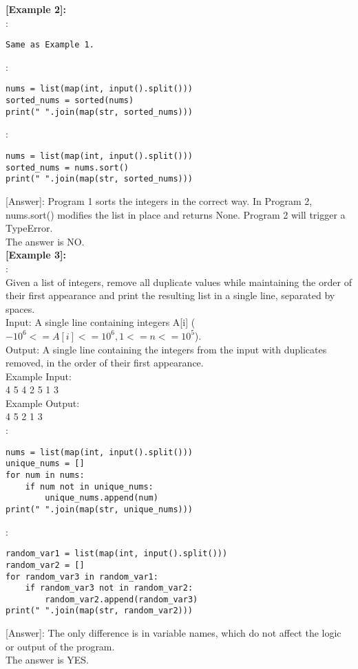 \noindent\textbf{[Example 2]:}\\
:\\
\begin{lstlisting}
Same as Example 1.
\end{lstlisting}
\text{    [Program 1]}:\\
\begin{lstlisting}
nums = list(map(int, input().split()))
sorted_nums = sorted(nums)
print(" ".join(map(str, sorted_nums)))
\end{lstlisting}
\text{    [Program 2]}:\\
\begin{lstlisting}
nums = list(map(int, input().split()))
sorted_nums = nums.sort()
print(" ".join(map(str, sorted_nums)))
\end{lstlisting}
[Answer]: Program 1 sorts the integers in the correct way. In Program 2, nums.sort() modifies the list in place and returns None. Program 2 will trigger a TypeError.\\
The answer is NO.\\

\noindent\textbf{[Example 3]:}\\
:\\
Given a list of integers, remove all duplicate values while maintaining the order of their first appearance and print the resulting list in a single line, separated by spaces.\\
Input: A single line containing integers A[i] ($-10^6 <= A[i] <= 10^6, 1 <= n <= 10^5$).\\
Output: A single line containing the integers from the input with duplicates removed, in the order of their first appearance.\\
Example Input:\\
4 5 4 2 5 1 3\\
Example Output:\\
4 5 2 1 3\\
\text{    [Program 1]}:\\
\begin{lstlisting}
nums = list(map(int, input().split()))
unique_nums = []
for num in nums:
    if num not in unique_nums:
        unique_nums.append(num)
print(" ".join(map(str, unique_nums)))
\end{lstlisting}
\text{    [Program 2]}:\\
\begin{lstlisting}
random_var1 = list(map(int, input().split()))
random_var2 = []
for random_var3 in random_var1:
    if random_var3 not in random_var2:
        random_var2.append(random_var3)
print(" ".join(map(str, random_var2)))
\end{lstlisting}
[Answer]: The only difference is in variable names, which do not affect the logic or output of the program.\\
The answer is YES.\\

